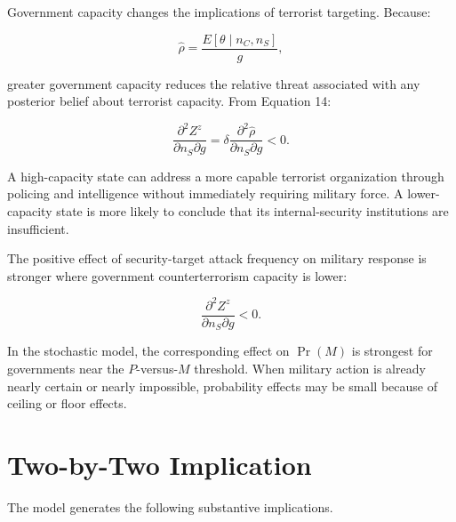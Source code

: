 \documentclass[
  letterpaper,
  DIV=11,
  numbers=noendperiod]{scrartcl}
\begin{document}
Government capacity changes the implications of terrorist targeting.
Because:

\[
\widehat{\rho}
=
\frac{E[\theta\mid n_C,n_S]}{g},
\]

greater government capacity reduces the relative threat associated with
any posterior belief about terrorist capacity. From Equation 14:

\[
\boxed{
\frac{\partial^2 Z^z}{\partial n_S\partial g}
=
\delta
\frac{\partial^2\widehat{\rho}}
{\partial n_S\partial g}<0.
}
\tag{27}
\]

A high-capacity state can address a more capable terrorist organization
through policing and intelligence without immediately requiring military
force. A lower-capacity state is more likely to conclude that its
internal-security institutions are insufficient.

\begin{tcolorbox}[enhanced jigsaw, arc=.35mm, bottomrule=.15mm, bottomtitle=1mm, breakable, colback=white, colbacktitle=quarto-callout-important-color!10!white, colframe=quarto-callout-important-color-frame, coltitle=black, left=2mm, leftrule=.75mm, opacityback=0, opacitybacktitle=0.6, rightrule=.15mm, title=\textcolor{quarto-callout-important-color}{\faExclamation}\hspace{0.5em}{Proposition 4: Relative-capacity conditioning}, titlerule=0mm, toprule=.15mm, toptitle=1mm]

The positive effect of security-target attack frequency on military
response is stronger where government counterterrorism capacity is
lower:

\[
\frac{\partial^2 Z^z}{\partial n_S\partial g}<0.
\]

In the stochastic model, the corresponding effect on \(\Pr(M)\) is
strongest for governments near the \(P\)-versus-\(M\) threshold. When
military action is already nearly certain or nearly impossible,
probability effects may be small because of ceiling or floor effects.

\end{tcolorbox}

\section{Two-by-Two Implication}\label{two-by-two-implication}

The model generates the following substantive implications.
\end{document}
